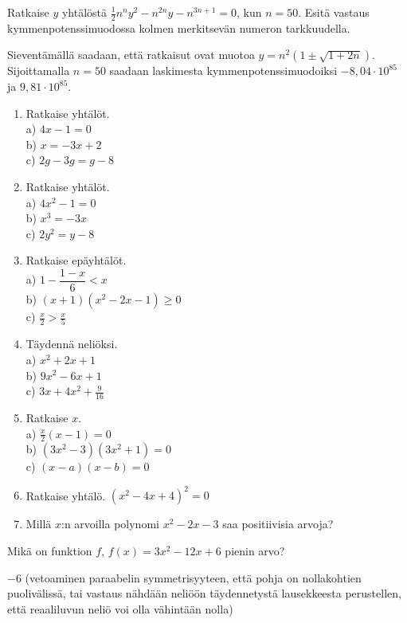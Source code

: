 \begin{tehtava}
Ratkaise $y$ yhtälöstä $\frac{1}{2}n^n y^2-n^{2n}y-n^{3n+1}=0$, kun $n=50$. Esitä vastaus kymmenpotenssimuodossa kolmen merkitsevän numeron tarkkuudella.
	\begin{vastaus}
	Sieventämällä saadaan, että ratkaisut ovat muotoa $y=n^2 (1\pm \sqrt{1+2n})$. Sijoittamalla $n=50$ saadaan laskimesta kymmenpotenssimuodoiksi $-8,04\cdot 10^{85}$ ja $9,81\cdot 10^{85}$.
	\end{vastaus}
\end{tehtava}

\begin{enumerate}
\item Ratkaise yhtälöt.\\ a) $4x-1=0$\\ b) $x=-3x+2$\\ c) $2g-3g=g-8$
\item Ratkaise yhtälöt.\\ a) $4x^2-1=0$\\ b) $x^3=-3x$\\ c) $2y^2=y-8$
\item Ratkaise epäyhtälöt.\\ a) $1-\dfrac{1-x}{6}<x$\\ b) $(x+1)(x^2-2x-1)\geq0$\\ c) $\frac{x}{2}>\frac{x}{5}$
\item Täydennä neliöksi. \\ a) $x^2+2x+1$\\ b) $9x^2-6x+1$\\ c) $3x+4x^2+\frac{9}{16}$
\item Ratkaise $x$. \\ a) $\frac{x}{2}(x-1)=0$\\ b) $(3x^2-3)(3x^2+1)=0$\\ c) $(x-a)(x-b)=0$
\item Ratkaise yhtälö. $(x^2-4x+4)^2=0$
\item Millä $x$:n arvoilla polynomi $x^2-2x-3$ saa positiivisia arvoja?
\end{enumerate}

\begin{tehtava}
Mikä on funktion $f$, $f(x)=3x^2-12x+6$ pienin arvo?
	\begin{vastaus}
	$-6$ (vetoaminen paraabelin symmetrisyyteen, että pohja on nollakohtien puolivälissä, tai vastaus nähdään neliöön täydennetystä lausekkeesta perustellen, että reaaliluvun neliö voi olla vähintään nolla)
	\end{vastaus}
\end{tehtava}
	

